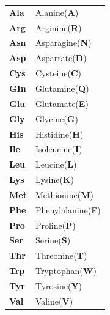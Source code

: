 \documentclass{article}
\begin{document}
\sffamily
\begin{tabular}{ l @{\;=\;} l }
    \textbf{Ala} & Alanine\;(\textbf{A})\\
    \textbf{Arg} & Arginine\;(\textbf{R})\\
    \textbf{Asn} & Asparagine\;(\textbf{N})\\
    \textbf{Asp} & Aspartate\;(\textbf{D})\\
    \textbf{Cys} & Cysteine\;(\textbf{C})\\
    \textbf{GIn} & Glutamine\;(\textbf{Q})\\
    \textbf{Glu} & Glutamate\;(\textbf{E})\\
    \textbf{Gly} & Glycine\;(\textbf{G})\\
    \textbf{His} & Histidine\;(\textbf{H})\\
    \textbf{Ile} & Isoleucine\;(\textbf{I})\\
    \textbf{Leu} & Leucine\;(\textbf{L})\\
    \textbf{Lys} & Lysine\;(\textbf{K})\\
    \textbf{Met} & Methionine\;(\textbf{M})\\
    \textbf{Phe} & Phenylalanine\;(\textbf{F})\\
    \textbf{Pro} & Proline\;(\textbf{P})\\
    \textbf{Ser} & Serine\;(\textbf{S})\\
    \textbf{Thr} & Threonine\;(\textbf{T})\\
    \textbf{Trp} & Tryptophan\;(\textbf{W})\\
    \textbf{Tyr} & Tyrosine\;(\textbf{Y})\\
    \textbf{Val} & Valine\;(\textbf{V})\\
\end{tabular}
\end{document}

